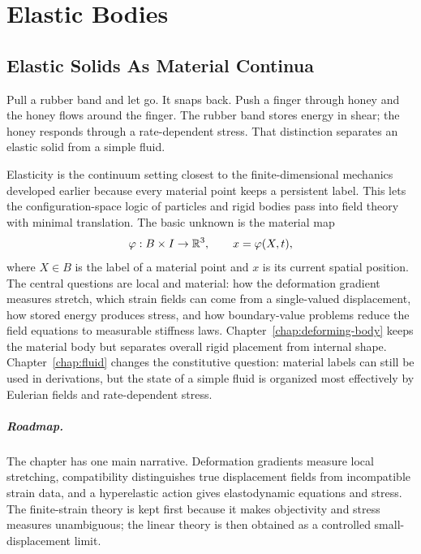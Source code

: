 \chapter{Elastic Bodies}
\label{chap:elastic-body}

\section{Elastic Solids As Material Continua}
\label{sec:elastic-material-continua}

Pull a rubber band and let go. It snaps back. Push a finger through honey and
the honey flows around the finger. The rubber band stores energy in shear; the
honey responds through a rate-dependent stress. That distinction separates an
elastic solid from a simple fluid.

Elasticity is the continuum setting closest to the finite-dimensional mechanics
developed earlier because every material point keeps a persistent label. This
lets the configuration-space logic of particles and rigid bodies pass into field
theory with minimal translation. The basic unknown is the material map
\[
  \varphi:B\times I\to\mathbb{R}^3,
  \qquad
  x=\varphi(X,t),
\]
where \(X\in B\) is the label of a material point and \(x\) is its current
spatial position. The central questions are local and material: how the
deformation gradient measures stretch, which strain fields can come from a
single-valued displacement, how stored energy produces stress, and how
boundary-value problems reduce the field equations to measurable stiffness
laws. Chapter~\ref{chap:deforming-body} keeps the material body but separates
overall rigid placement from internal shape. Chapter~\ref{chap:fluid} changes
the constitutive question: material labels can still be used in derivations, but
the state of a simple fluid is organized most effectively by Eulerian fields and
rate-dependent stress.

\paragraph{Roadmap.}
The chapter has one main narrative.  Deformation gradients measure local
stretching, compatibility distinguishes true displacement fields from
incompatible strain data, and a hyperelastic action gives elastodynamic
equations and stress.  The finite-strain theory is kept first because it makes
objectivity and stress measures unambiguous; the linear theory is then obtained
as a controlled small-displacement limit.

